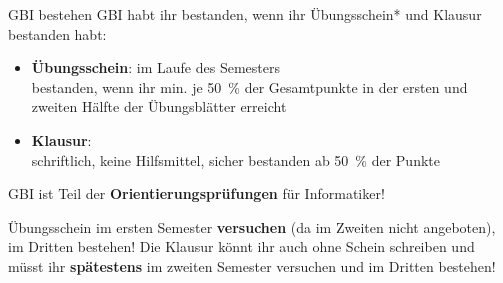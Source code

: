 

\begin{frame}[t]{GBI bestehen}
	GBI habt ihr bestanden, wenn ihr Übungsschein* und Klausur bestanden habt:
	\begin{itemize}
		\item \textbf{Übungsschein}: im Laufe des Semesters \\
			  bestanden, wenn ihr min. je 50~\% der Gesamtpunkte in der ersten und zweiten Hälfte der Übungsblätter erreicht \\

		\item \textbf{Klausur}: \Klausurtermin \\
			  schriftlich, keine Hilfsmittel, sicher bestanden ab 50~\% der Punkte
	\end{itemize}
	\pause
	\pause
	GBI ist Teil der \textbf{Orientierungsprüfungen} für Informatiker!
	\begin{itemize}
		\implitem Übungsschein im ersten Semester \textbf{versuchen} (da im Zweiten nicht angeboten), im Dritten bestehen! 
		\implitem Die Klausur könnt ihr auch ohne Schein schreiben und müsst ihr \textbf{spätestens} im zweiten Semester versuchen und im Dritten bestehen!
	\end{itemize}
\end{frame}

